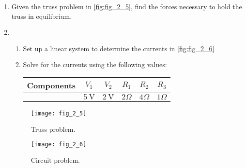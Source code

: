 \documentclass[../main.tex]{subfiles}
\begin{document}
\begin{enumerate}[label=\textbf{2.\arabic*}]
\item Given the truss problem in \autoref{fig:fig_2_5}, find the forces necessary to hold the truss in equilibrium.

\item	\begin{enumerate}[label=\textbf{\alph*.}]
	\item Set up a linear system to determine the currents in \autoref{fig:fig_2_6}

	\item Solve for the currents using the following values:

	\begin{tabular}{|l|c|c|c|c|c|}
		\hline Components & $V_{1}$ & $V_{2}$ & $R_{1}$ & $R_{2}$ & $R_{3}$  \\
		\hline & $5 \mathrm{~V}$ & $2 \mathrm{~V}$ & $2 \Omega$ &  $4 \Omega$ & $1 \Omega$ \\
		\hline
	\end{tabular}
\end{enumerate}

\begin{figure}
	\centering
	\texttt{[image: fig\_2\_5]}
	\caption{Truss problem.}
	\label{fig:fig_2_5}
\end{figure}

\begin{figure}
	\centering
	\texttt{[image: fig\_2\_6]}
	\caption{Circuit problem.}
	\label{fig:fig_2_6}
\end{figure}
\end{enumerate}
\end{document}
